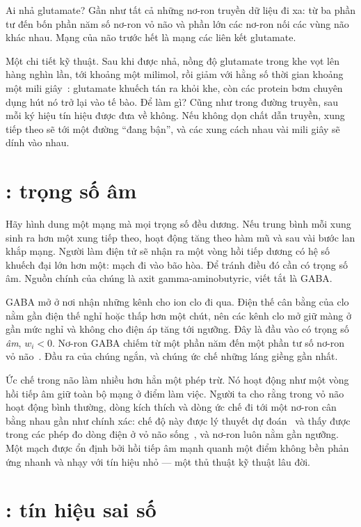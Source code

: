 Ai nhả glutamate? Gần như tất cả những nơ-ron truyền dữ liệu đi xa: từ ba phần tư đến bốn phần năm số nơ-ron vỏ não và phần lớn các nơ-ron nối các vùng não khác nhau. Mạng của não trước hết là mạng các liên kết glutamate.

Một chi tiết kỹ thuật. Sau khi được nhả, nồng độ glutamate trong khe vọt lên hàng nghìn lần, tới khoảng một milimol, rồi giảm với hằng số thời gian khoảng một mili giây~\cite{Clements1992}: glutamate khuếch tán ra khỏi khe, còn các protein bơm chuyên dụng hút nó trở lại vào tế bào. Để làm gì? Cũng như trong đường truyền, sau mỗi ký hiệu tín hiệu được đưa về không. Nếu không dọn chất dẫn truyền, xung tiếp theo sẽ tới một đường ``đang bận'', và các xung cách nhau vài mili giây sẽ dính vào nhau.

\section{: trọng số âm}

Hãy hình dung một mạng mà mọi trọng số đều dương. Nếu trung bình mỗi xung sinh ra hơn một xung tiếp theo, hoạt động tăng theo hàm mũ và sau vài bước lan khắp mạng. Người làm điện tử sẽ nhận ra một vòng hồi tiếp dương có hệ số khuếch đại lớn hơn một: mạch đi vào bão hòa. Để tránh điều đó cần có trọng số âm. Nguồn chính của chúng là axit gamma-aminobutyric, viết tắt là GABA.

GABA mở ở nơi nhận những kênh cho ion clo đi qua. Điện thế cân bằng của clo nằm gần điện thế nghỉ hoặc thấp hơn một chút, nên các kênh clo mở giữ màng ở gần mức nghỉ và không cho điện áp tăng tới ngưỡng. Đây là đầu vào có trọng số \emph{âm}, $w_i<0$. Nơ-ron GABA chiếm từ một phần năm đến một phần tư số nơ-ron vỏ não~\cite{Hendry1987}. Đầu ra của chúng ngắn, và chúng ức chế những láng giềng gần nhất.

Ức chế trong não làm nhiều hơn hẳn một phép trừ. Nó hoạt động như một vòng hồi tiếp âm giữ toàn bộ mạng ở điểm làm việc. Người ta cho rằng trong vỏ não hoạt động bình thường, dòng kích thích và dòng ức chế đi tới một nơ-ron cân bằng nhau gần như chính xác: chế độ này được lý thuyết dự đoán~\cite{vanVreeswijk1996} và thấy được trong các phép đo dòng điện ở vỏ não sống~\cite{Haider2006}, và nơ-ron luôn nằm gần ngưỡng. Một mạch được ổn định bởi hồi tiếp âm mạnh quanh một điểm không bền phản ứng nhanh và nhạy với tín hiệu nhỏ --- một thủ thuật kỹ thuật lâu đời.

\section{: tín hiệu sai số}

